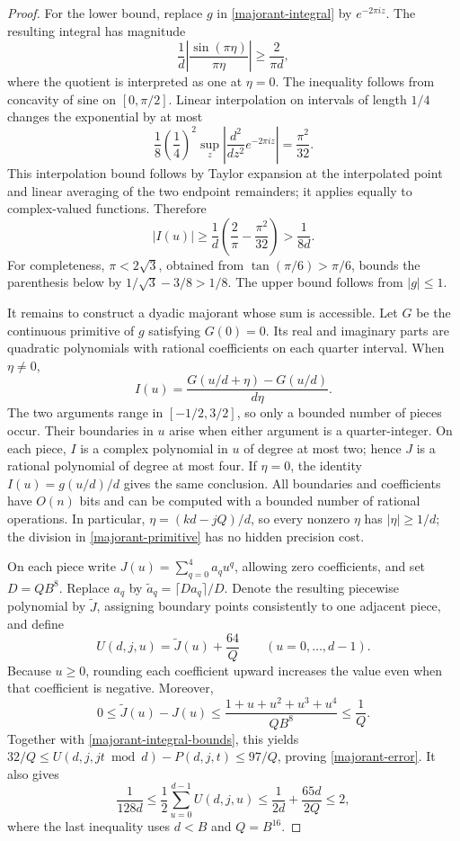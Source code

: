 \begin{proof}
For the lower bound, replace \(g\) in \eqref{majorant-integral} by
\(e^{-2\pi i z}\).  The resulting integral has magnitude
\[
 \frac1d\left|\frac{\sin(\pi\eta)}{\pi\eta}\right|
 \ge \frac2{\pi d},
\]
where the quotient is interpreted as one at \(\eta=0\).
The inequality follows from concavity of sine on \([0,\pi/2]\).
Linear interpolation on intervals of length \(1/4\) changes the
exponential by at most
\[
 \frac18\left(\frac14\right)^2
 \sup_z\left|\frac{d^2}{dz^2}e^{-2\pi i z}\right|
 =\frac{\pi^2}{32}.
\]
This interpolation bound follows by Taylor expansion at the interpolated
point and linear averaging of the two endpoint remainders; it applies
equally to complex-valued functions.  Therefore
\[
 |I(u)|\ge \frac1d\left(\frac2\pi-\frac{\pi^2}{32}\right)>\frac1{8d}.
\]
For completeness, \(\pi<2\sqrt3\), obtained from
\(\tan(\pi/6)>\pi/6\), bounds the parenthesis below by
\(1/\sqrt3-3/8>1/8\).  The upper bound follows from \(|g|\le1\).

It remains to construct a dyadic majorant whose sum is accessible.
Let \(G\) be the continuous primitive of \(g\) satisfying \(G(0)=0\).
Its real and imaginary parts are quadratic polynomials with rational
coefficients on each quarter interval.  When \(\eta\ne0\),
\begin{equation}\label{majorant-primitive}
 I(u)=\frac{G(u/d+\eta)-G(u/d)}{d\eta}.
\end{equation}
The two arguments range in \([-1/2,3/2]\), so only a bounded number of
pieces occur.  Their boundaries in \(u\) arise when either argument is a
quarter-integer.  On each piece, \(I\) is a complex polynomial in \(u\) of
degree at most two; hence \(J\) is a rational polynomial of degree at most
four.  If \(\eta=0\), the identity \(I(u)=g(u/d)/d\) gives the same conclusion.
All boundaries and coefficients have \(O(n)\) bits and can be computed with
a bounded number of rational operations.  In particular,
\(\eta=(kd-jQ)/d\), so every nonzero \(\eta\) has
\(|\eta|\ge1/d\); the division in \eqref{majorant-primitive} has no hidden
precision cost.

On each piece write \(J(u)=\sum_{q=0}^4a_qu^q\), allowing zero coefficients,
and set \(D=QB^8\).  Replace \(a_q\) by
\(\widetilde a_q=\lceil Da_q\rceil/D\).  Denote the resulting piecewise
polynomial by \(\widetilde J\), assigning boundary points consistently to
one adjacent piece, and define
\begin{equation}\label{majorant-construction}
 U(d,j,u)=\widetilde J(u)+\frac{64}{Q}
 \qquad (u=0,\ldots,d-1).
\end{equation}
Because \(u\ge0\), rounding each coefficient upward increases the value
even when that coefficient is negative.  Moreover,
\[
 0\le \widetilde J(u)-J(u)
 \le \frac{1+u+u^2+u^3+u^4}{QB^8}\le\frac1Q.
\]
Together with \eqref{majorant-integral-bounds}, this yields
\(32/Q\le U(d,j,jt\bmod d)-P(d,j,t)\le97/Q\), proving
\eqref{majorant-error}.  It also gives
\[
 \frac1{128d}
 \le\frac12\sum_{u=0}^{d-1}U(d,j,u)
 \le\frac1{2d}+\frac{65d}{2Q}\le2,
\]
where the last inequality uses \(d<B\) and \(Q=B^{16}\).


\end{proof}
